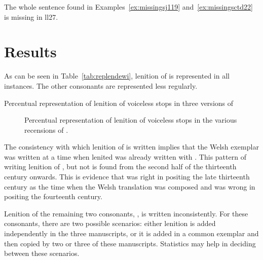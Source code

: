 \begin{mwl}
\end{mwl}

The whole sentence found in Examples~\ref{ex:missingsj119} and~\ref{ex:missingsctd22} is missing in \gls{ll27}.

\section{Results}
\label{sec:results-1}
As can be seen in Table~\ref{tab:replendewi}, lenition of  is represented in all instances. The other consonants are represented less regularly.
\begin{table}[h]
  \centering
  
  \caption{Percentual representation of lenition of voiceless stops in three versions of }
  \label{tab:replendewi}
\end{table} 

\begin{figure}[h]
  \centering
  
  \caption{Percentual representation of lenition of voiceless stops in the various recensions of .}
  \label{fig:barchartdewi}
\end{figure}

The consistency with which lenition of  is written implies that the Welsh exemplar was written at a time when lenited  was already written with . This pattern of writing lenition of , but not  is found from the second half of the thirteenth century onwards. This is evidence that \textcite{Rob_Ystoriaeu11} was right in positing the late thirteenth century as the time when the Welsh translation was composed and \textcite{Eva_Welsh88} was wrong in positing the fourteenth century.

Lenition of the remaining two consonants, , is written inconsistently. For these consonants, there are two possible scenarios: either lenition is added independently in the three manuscripts, or it is added in a common exemplar and then copied by two or three of these manuscripts. Statistics may help in deciding between these scenarios.

